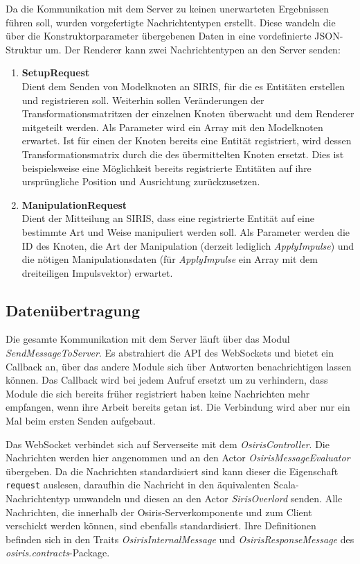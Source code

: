 Da die Kommunikation mit dem Server zu keinen unerwarteten Ergebnissen führen soll, wurden vorgefertigte Nachrichtentypen erstellt. Diese wandeln die über die Konstruktorparameter übergebenen Daten in eine vordefinierte JSON-Struktur um. Der Renderer kann zwei Nachrichtentypen an den Server senden:
\begin{enumerate}
    \item \textbf{SetupRequest}\\
Dient dem Senden von Modelknoten an SIRIS, für die es Entitäten erstellen und registrieren soll. Weiterhin sollen Veränderungen der Transformationsmatritzen der einzelnen Knoten überwacht und dem Renderer mitgeteilt werden. Als Parameter wird ein Array mit den Modelknoten erwartet. Ist für einen der Knoten bereits eine Entität registriert, wird dessen Transformationsmatrix durch die des übermittelten Knoten ersetzt. Dies ist beispielsweise eine Möglichkeit bereits registrierte Entitäten auf ihre ursprüngliche Position und Ausrichtung zurückzusetzen.
    \item \textbf{ManipulationRequest}\\
Dient der Mitteilung an SIRIS, dass eine registrierte Entität auf eine bestimmte Art und Weise manipuliert werden soll. Als Parameter werden die ID des Knoten, die Art der Manipulation (derzeit lediglich \textit{ApplyImpulse}) und die nötigen Manipulationsdaten (für \textit{ApplyImpulse} ein Array mit dem dreiteiligen Impulsvektor) erwartet.
\end{enumerate}

\subsection{Datenübertragung}
Die gesamte Kommunikation mit dem Server läuft über das Modul \textit{SendMessageToServer}. Es abstrahiert die API des WebSockets und bietet ein Callback an, über das andere Module sich über Antworten benachrichtigen lassen können. Das Callback wird bei jedem Aufruf ersetzt um zu verhindern, dass Module die sich bereits früher registriert haben keine Nachrichten mehr empfangen, wenn ihre Arbeit bereits getan ist. Die Verbindung wird aber nur ein Mal beim ersten Senden aufgebaut.

Das WebSocket verbindet sich auf Serverseite mit dem \textit{OsirisController}. Die Nachrichten werden hier angenommen und an den Actor \textit{OsirisMessageEvaluator} übergeben. Da die Nachrichten standardisiert sind kann dieser die Eigenschaft \texttt{request} auslesen, daraufhin die Nachricht in den äquivalenten Scala-Nachrichtentyp umwandeln und diesen an den Actor \textit{SirisOverlord} senden. Alle Nachrichten, die innerhalb der Osiris-Serverkomponente und zum Client verschickt werden können, sind ebenfalls standardisiert. Ihre Definitionen befinden sich in den Traits \textit{OsirisInternalMessage} und \textit{OsirisResponseMessage} des \textit{osiris.contracts}-Package.

